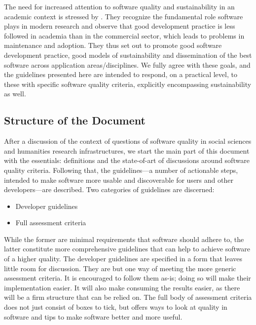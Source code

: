 \documentclass[a4paper,11pt]{article}
\begin{document}
The need for increased attention to software quality and sustainability in an
academic context is stressed by
\cite{RESEARCHSOFTWARE}.
They recognize the fundamental role software plays in modern research and
observe that good development practice is less followed in academia than in the
commercial sector, which leads to problems in maintenance and adoption. They
thus set out to promote good software development practice, good models of
sustainability and dissemination of the best software across application
areas/disciplines. We fully agree with these goals, and the guidelines
presented here are intended to respond, on a practical level, to these with
specific software quality criteria, explicitly encompassing sustainability as
well.

\subsection{Structure of the Document}\label{sec:struc}

After a discussion of the context of questions of software quality in social
sciences and humanities research infrastructures, we start the main part of
this document with the essentials: definitions and the state-of-art of
discussions around software quality criteria.  Following that, the
guidelines---a number of actionable steps, intended to make software more
usable and discoverable for users and other developers---are described. Two
categories of guidelines are discerned: 

\begin{itemize}
	\item Developer guidelines %
    \item Full assessment criteria %
\end{itemize}

While the former are minimal requirements that software should adhere to, the
latter constitute more comprehensive guidelines that can help to achieve software of
a higher quality. The developer guidelines are specified in a form that leaves little
room for discussion. They are but one way of meeting the more generic
assessment criteria. It is encouraged to follow them as-is; doing so will make their
implementation easier. It will also make consuming the results easier, as there
will be a firm structure that can be relied on.  The full body of assessment
criteria does not just consist of boxes to tick, but offers ways to look at quality in software and tips to make software
better and more useful. 
\end{document}

